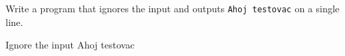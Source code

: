 




Write a program that ignores the input and outputs \texttt{Ahoj testovac} on a single line.

\vstup
Ignore the input
\vystup
Ahoj testovac
\koniec

